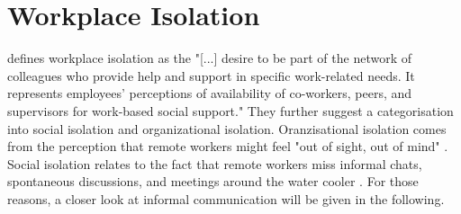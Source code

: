\section{Workplace Isolation}
\textcite{marshall2007workplace} defines workplace isolation as the "[...] desire to be part of the network of colleagues who provide help and support in specific work-related needs. It represents employees’ perceptions of availability of co-workers, peers, and supervisors for work-based social support." They further suggest a categorisation into social isolation and organizational isolation. Oranzisational isolation comes from the perception that remote workers might feel "out of sight, out of mind" \autocite{bailey1999advantages}. Social isolation relates to the fact that remote workers miss informal chats, spontaneous discussions, and meetings around the water cooler \autocite{cooper2002telecommuting}. For those reasons, a closer look at informal communication will be given in the following.

